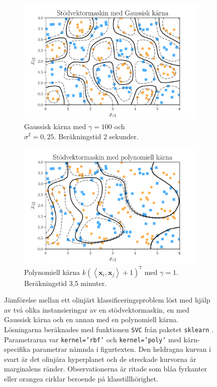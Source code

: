 \documentclass[a4paper, 12pt]{report}
\theoremstyle{definition}
\theoremstyle{remark}
\newcommand{\bfx}{\mathbf{x}}
\newcommand{\llangle}{\left\langle}
\newcommand{\rrangle}{\right\rangle}
\newcommand{\inner}[2]{\llangle #1, #2 \rrangle}
\begin{document}
	\begin{figure}[h]
		\centering
		\begin{subfigure}{0.5\linewidth}
			\centering
			\includegraphics[width=1.05\linewidth, trim={0.35cm 1.5mm 0.4cm 4.5mm}, clip]{KandFigur6.pdf}
			\caption{\label{fig:RBF}Gaussisk kärna med $\gamma=100$ och\\ $\sigma^2=0,25$. Beräkningstid 2 sekunder.}
		\end{subfigure}%
		\begin{subfigure}{0.5\linewidth}
			\centering
			\includegraphics[width=1.05\linewidth, trim={0.35cm 1.5mm 0.4cm 4.5mm}, clip]{KandFigur7.pdf}
			\caption{\label{fig:Polkärna}Polynomiell kärna $k\left(\inner{\bfx_i}{\bfx_j}+1\right)^{7}$ med $\gamma=1$. Beräkningstid 3,5 minuter.}
		\end{subfigure}
		\caption{\label{fig:jämförelse}Jämförelse mellan ett olinjärt klassificeringsproblem löst med hjälp av två olika instansieringar av en stödvektormaskin, en med Gaussisk kärna och en annan med en polynomiell kärna. Lösningarna beräknades med funktionen \texttt{SVC} från paketet \texttt{sklearn} \cite{sklearn}. Parametrarna var \texttt{kernel='rbf'} och \texttt{kernel='poly'} med kärn-specifika parametrar nämnda i figurtexten. Den heldragna kurvan i svart är det olinjära hyperplanet och de streckade kurvorna är marginalens ränder. Observationerna är ritade som blåa fyrkanter eller orangea cirklar beroende på klasstillhörighet.}
	\end{figure}
\end{document}
